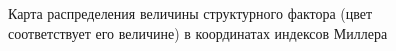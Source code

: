   \begin{figure}[h]
    \centering
    \hfill
    \caption{Карта распределения величины структурного фактора
    (цвет соответствует его величине) в координатах индексов Миллера}
    \label{ris:hkl_LGT_SI}
  \end{figure}
